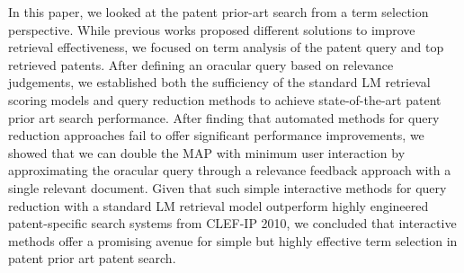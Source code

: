 In this paper, we looked at the patent prior-art search from a term
selection perspective.  While previous works proposed different
solutions to improve retrieval effectiveness, we focused on term
analysis of the patent query and top retrieved patents.  After
defining an oracular query based on relevance judgements, we
established both the sufficiency of the standard LM retrieval scoring
models and query reduction methods to achieve state-of-the-art patent
prior art search performance.  After finding that automated methods
for query reduction approaches fail to offer significant performance
improvements,
we showed that we can double the MAP with minimum user interaction by
approximating the oracular query through a relevance feedback approach
with a single relevant document.  Given that such simple interactive
methods for query reduction with a standard LM retrieval model
outperform highly engineered patent-specific search systems from
CLEF-IP 2010, we concluded that interactive methods offer a promising
avenue for simple but highly effective term selection in patent prior
art patent search.




